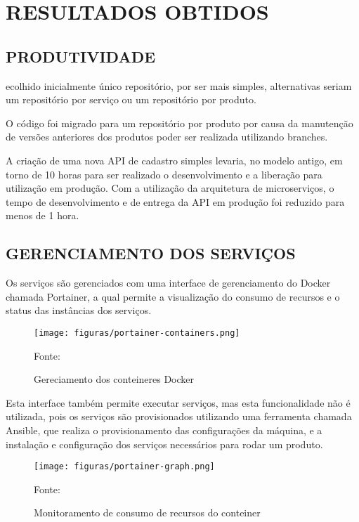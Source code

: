 \chapter{RESULTADOS OBTIDOS}
\label{chp:resultados}

\section{PRODUTIVIDADE}

ecolhido inicialmente único repositório, por ser mais simples, alternativas
seriam um repositório por serviço ou um repositório por produto.

O código foi migrado para um repositório por produto por causa da manutenção
de versões anteriores dos produtos poder ser realizada utilizando branches.

A criação de uma nova \ac{API} de cadastro simples levaria, no modelo antigo,
em torno de 10 horas para ser realizado o desenvolvimento e a liberação para
utilização em produção. Com a utilização da arquitetura de microserviços, o
tempo de desenvolvimento e de entrega da \ac{API} em produção foi reduzido para
menos de 1 hora.

\section{GERENCIAMENTO DOS SERVIÇOS}

Os serviços são gerenciados com uma interface de gerenciamento do Docker chamada
Portainer, a qual permite a visualização do consumo de recursos e o status das
instâncias dos serviços.

\begin{figure}[H]
	\centering
	\caption{Gereciamento dos conteineres Docker}
	\texttt{[image: figuras/portainer-containers.png]}

	\label{fig:portainer-containers}
	\footnotesize Fonte: \fonteOAutor
\end{figure}

Esta interface também permite executar serviços, mas esta funcionalidade não é
utilizada, pois os serviços são provisionados utilizando uma ferramenta chamada
Ansible, que realiza o provisionamento das configurações da máquina, e a
instalação e configuração dos serviços necessários para rodar um produto.

\begin{figure}[H]
	\centering
	\caption{Monitoramento de consumo de recursos do conteiner}
	\texttt{[image: figuras/portainer-graph.png]}

	\label{fig:portainer-graph}
	\footnotesize Fonte: \fonteOAutor
\end{figure}

